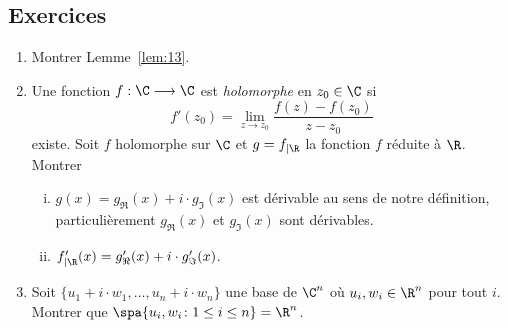 {\begin{example}
\end{example}









}

\subsection*{Exercices} 

\begin{enumerate}
\item Montrer Lemme~\ref{lem:13}. 
\item Une fonction $f:\C \longrightarrow \C$ est \emph{holomorphe} en $z_0 \in \C$ si
  \begin{displaymath}
    f'(z_0) = \lim_{z \rightarrow z_0} \frac{f(z) - f(z_0)}{z - z_0} 
  \end{displaymath}
existe. Soit $f$ holomorphe sur $\C$ et $g = f_{|\R}$ la fonction $f$ réduite à $\R$. 
 Montrer 
\begin{enumerate}[i)]
\item  $g(x) = g_\Re(x) + i \cdot g_\Im(x)$ est dérivable au  sens de notre définition, particulièrement $g_\Re(x)$ et $ g_\Im(x)$ sont dérivables. 
\item $f'_{| \R} (x) = g'_\Re(x) + i \cdot g'_\Im(x)$. 
\end{enumerate}
\item Soit $\{u_1+ i \cdot w_1,\dots,u_n + i \cdot w_n\}$ une base de $\C^n$ où $u_i,w_i \in \R^n$  pour tout $i$. Montrer que $\spa\{u_i, w_i \colon 1 \leq i \leq n\} = \R^n$. \label{item:5}
\end{enumerate}






